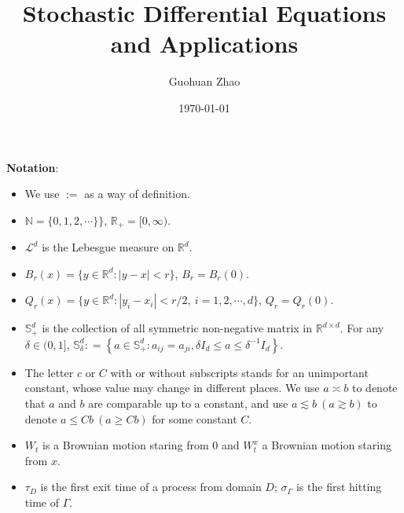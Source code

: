 \documentclass[twoside, 12pt]{book}
\numberwithin{equation}{chapter}
\def\mN{{\mathbb N}}
\def\mR{{\mathbb R}}
\def\mS{{\mathbb S}}
\def\sL{{\mathscr L}}
\def\l{\left}
\def\r{\right}
\def\geq{\geqslant}
\def\leq{\leqslant}
\begin{document}
	
	\title{Stochastic Differential Equations and Applications}
	
	\author{Guohuan Zhao}
	\date{\today}
	
	\maketitle
	\tableofcontents
	
	\newpage 
	
	{\bf Notation}: 
	\begin{itemize}
		\item We use $:=$ as a way of definition. 
		\item $\mN=\{0,1,2,\cdots\}\}$, $\mR_+=[0,\infty)$. 
		\item $\sL^d$ is the Lebesgue measure on $\mR^d$. 
		\item $B_r(x)=\{y\in\mR^d: |y-x|<r\}$, $B_r=B_r(0)$. 
		\item $Q_r(x)=\{y\in \mR^d: |y_i-x_i|<r/2, ~ i=1,2,\cdots, d\}$, $Q_r=Q_r(0)$. 
		\item $\mS^d_+$ is the collection of all symmetric non-negative matrix in $\mR^{d\times d}$. For any $\delta\in (0,1]$, $\mS_\delta^d : = \l\{a\in \mS^d_+: a_{ij}=a_{ji}, \delta I_d \leq a \leq \delta^{-1} I_d \r\}$. 
		\item The letter $c$ or $C$ with or without subscripts stands for an unimportant constant, whose value may change in different places. We use $a \asymp b$ to denote that $a$ and $b$ are comparable up to a constant, and use $a\lesssim b~(a\gtrsim b)$ to denote $a\leq Cb~(a\geq Cb)$ for some constant $C$.
		\item $W_t$ is a Brownian motion staring from $0$ and $W_t^x$ a Brownian motion staring from $x$.
  \item $\tau_D$ is the first exit time of a process from domain $D$; $\sigma_\Gamma$ is the first hitting time of $\Gamma$.  
	\end{itemize}
	
\end{document}
